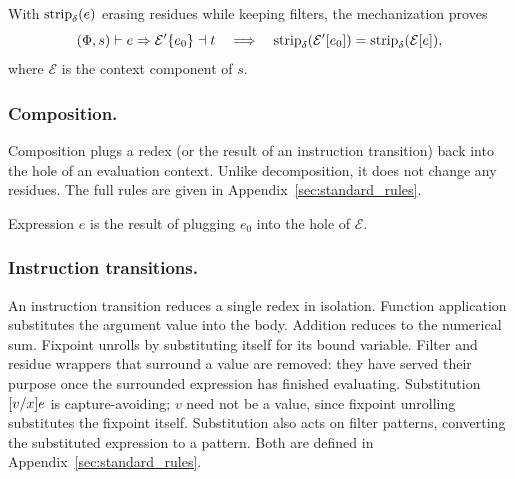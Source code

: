\begin{mathpar}
\end{mathpar}
\begin{mathpar}
\end{mathpar}
\begin{mathpar}
\end{mathpar}
\begin{mathpar}
\end{mathpar}

With \(\operatorname{strip}_{\delta}(e)\) erasing residues while keeping filters,
the mechanization proves
\[
 (\Phi,s) \vdash e \Rightarrow \mathcal{E}' \{ e_0 \} \dashv t
 \quad\Longrightarrow\quad
 \operatorname{strip}_{\delta}(\mathcal{E}'[e_0])
 =\operatorname{strip}_{\delta}(\mathcal{E}[e]),
\]
where \(\mathcal{E}\) is the context component of \(s\).

\subsubsection{Composition.} Composition plugs a redex (or the result
of an instruction transition) back into the hole of an evaluation
context. Unlike decomposition, it does not change any residues. The
full rules are given in Appendix~\ref{sec:standard_rules}.

 Expression \(e\) is the
result of plugging \(e_0\) into the hole of \(\mathcal{E}\).

\subsubsection{Instruction transitions.} An instruction transition
reduces a single redex in isolation. Function application
substitutes the argument value into the body. Addition reduces to
the numerical sum. Fixpoint unrolls by substituting itself for its
bound variable. Filter and residue wrappers that surround a value
are removed: they have served their purpose once the surrounded
expression has finished evaluating. Substitution \([v/x] e\)
is capture-avoiding; \(v\) need not be a value, since fixpoint
unrolling substitutes the fixpoint itself. Substitution also acts on
filter patterns, converting the substituted expression to a pattern.
Both are defined in Appendix~\ref{sec:standard_rules}.

